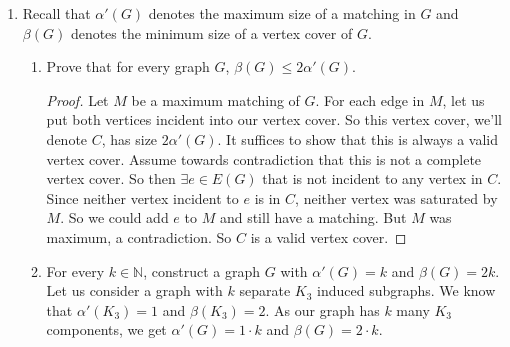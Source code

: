 \documentclass[12pt]{article}
\begin{document}
\begin{enumerate}
\begin{proof}
\begin{center}
{			1_r -- {1_c,3_c};
			2_r -- {2_c};
			3_r -- {1_c,3_c};
		};
	\end{center}
	If we can show there is a perfect matching on this graph, then there is a permutation matrix we can subtract off of the matrix, as every row will be paired with a column.\\
	Let $S\subseteq X$. Since $M$ has rows adding up to $k$, $\sum_{x\in S}\sum_{y\in Y} M_{x,y} = k|S|$. The neighborhood of $S$ will contain every column that has a positive number in any of the rows. If a column is not in the neighborhood, then it has a 0 in every row in $S$. So the columns outside of $N(S)$ do not contribute to that summation. So $\sum_{x\in S}\sum_{y\in Y} M_{x,y} = \sum_{x\in S}\sum_{y\in N(S)} M_{x,y} = k|S|$.\\
	Since $S$ is a subset of $X$, $\sum_{x\in S}\sum_{y\in N(S)} M_{x,y} \leq \sum_{x\in X}\sum_{y\in N(S)} M_{x,y}$. Since the columns add up to $k$, $\sum_{x\in X}\sum_{y\in N(S)} M_{x,y} = k|N(S)|$. So we have $k|S|= \sum_{x\in S}\sum_{y\in N(S)} M_{x,y} \leq \sum_{x\in X}\sum_{y\in N(S)} M_{x,y} = k|N(S)|$. So $k|S|\leq k|N(S)| \implies |S|\leq|N(S)|$.\\
	So by Hall's theorem, we know we can subtract off a permutation matrix from $M$. We shall call this subtracted permutation matrix $P$ and the new matrix $M'$. We have $M = P+M'$. Since $P$ is a permutation matrix, each row and column of $M'$ now adds up to $k-1$. By the induction hypothesis, we know $M'$ can be expressed as a sum of $k-1$ permutation matrices. So $M$ can be expressed as those same permutations matrices plus $P$.
\end{proof}


\medskip

\item Recall that $\alpha'(G)$ denotes the maximum size of a matching in $G$ and $\beta(G)$ denotes the minimum size of a vertex cover of $G$.
\begin{enumerate}
\item Prove that for every graph $G$, $\beta(G) \leq 2 \alpha'(G)$.
\begin{proof}
	Let $M$ be a maximum matching of $G$. For each edge in $M$, let us put both vertices incident into our vertex cover. So this vertex cover, we'll denote $C$, has size $2 \alpha'(G)$. It suffices to show that this is always a valid vertex cover. Assume towards contradiction that this is not a complete vertex cover. So then $\exists e\in E(G)$ that is not incident to any vertex in $C$. Since neither vertex incident to $e$ is in $C$, neither vertex was saturated by $M$. So we could add $e$ to $M$ and still have a matching. But $M$ was maximum, a contradiction. So $C$ is a valid vertex cover.
\end{proof}
\item For every $k \in \mathbb N$, construct a graph $G$ with $\alpha'(G) = k$ and $\beta(G) = 2k$.\m
Let us consider a graph with $k$ separate $K_3$ induced subgraphs. We know that $\alpha'(K_3)=1$ and $\beta(K_3)=2$. As our graph has $k$ many $K_3$ components, we get $\alpha'(G)=1\cdot k$ and $\beta(G)=2\cdot k$.
\end{enumerate}


\end{enumerate}
\end{document}
